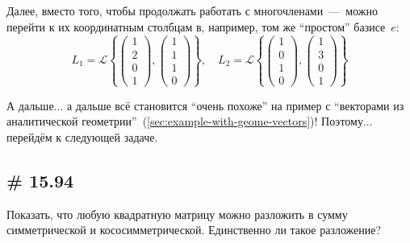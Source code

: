 \documentclass[a4paper,12pt]{article}
\begin{document}
\begin{solution}
    Далее, вместо того, чтобы продолжать работать с многочленами~---~можно перейти к их координатным столбцам в, например, том же ``простом'' базисе~$e$:
    \[
      L_1 = \mathcal L \left\{
        \begin{pmatrix} 1 \\ 2 \\ 0 \\ 1 \end{pmatrix},
        \begin{pmatrix} 1 \\ 1 \\ 1 \\ 0 \end{pmatrix}
      \right\},
      \quad L_2 = \mathcal L \left\{
        \begin{pmatrix} 1 \\ 0 \\ 1 \\ 0 \end{pmatrix},
        \begin{pmatrix} 1 \\ 3 \\ 0 \\ 1 \end{pmatrix}
      \right\}
    \]
    
    А дальше... а дальше всё становится ``очень похоже'' на пример с ``векторами из аналитической геометрии''~(\ref{sec:example-with-geome-vectors})!
    Поэтому... перейдём к следующей задаче.
  \end{solution}
  
  
  \subsection{\# 15.94}
  
  Показать, что любую квадратную матрицу можно разложить в сумму симметрической и кососимметрической.
  Единственно ли такое разложение?
  
\end{document}
